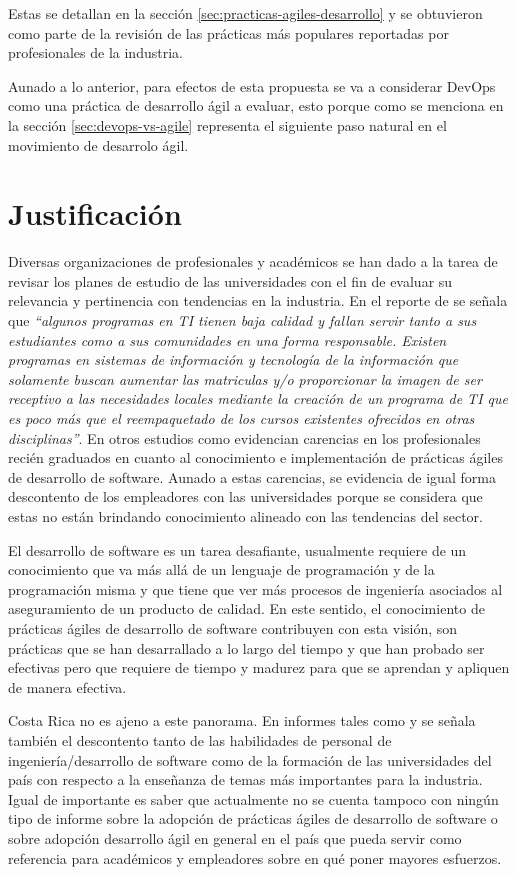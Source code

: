 Estas se detallan en la sección \ref{sec:practicas-agiles-desarrollo} y se obtuvieron como parte de la revisión de las prácticas más populares reportadas por profesionales de la industria.  

Aunado a lo anterior, para efectos de esta propuesta se va a considerar DevOps como una práctica de desarrollo ágil a evaluar, esto porque como se menciona en la sección \ref{sec:devops-vs-agile} representa el siguiente paso natural en el movimiento de desarrolo ágil.

\section{Justificación}
Diversas organizaciones de profesionales y académicos se han dado a la tarea de revisar los planes de estudio de las universidades con el fin de evaluar su relevancia y pertinencia con tendencias en la industria. En el reporte de \cite{shackelford-et-al} se señala que \emph{``algunos programas en TI tienen baja calidad y fallan servir tanto a sus estudiantes como a sus comunidades en una forma responsable. Existen programas en sistemas de información y tecnología de la información que solamente buscan aumentar las matriculas y/o proporcionar la imagen de ser receptivo a las necesidades locales mediante la creación de un programa de TI que es poco más que el reempaquetado de los cursos existentes ofrecidos en otras disciplinas''}. En otros estudios como \cite{advance-it, kropp-meier-1, radermacher-walia} evidencian carencias en los profesionales recién graduados en cuanto al conocimiento e implementación de prácticas ágiles de desarrollo de software. Aunado a estas carencias, se evidencia de igual forma descontento de los empleadores con las universidades porque se considera que estas no están brindando conocimiento alineado con las tendencias del sector.

El desarrollo de software es un tarea desafiante, usualmente requiere de un conocimiento que va más allá de un lenguaje de programación y de la programación misma y que tiene que ver más procesos de ingeniería asociados al aseguramiento de un producto de calidad. En este sentido, el conocimiento de prácticas ágiles de desarrollo de software contribuyen con esta visión, son prácticas que se han desarrallado a lo largo del tiempo y que han probado ser efectivas pero que requiere de tiempo y madurez para que se aprendan y apliquen de manera efectiva. 

Costa Rica no es ajeno a este panorama. En informes tales como \cite{prosic} y \cite{murillo-trejos} se señala también el descontento tanto de las habilidades de personal de ingeniería/desarrollo de software como de la formación de las universidades del país con respecto a la enseñanza de temas más importantes para la industria. Igual de importante es saber que actualmente no se cuenta tampoco con ningún tipo de informe sobre la adopción de prácticas ágiles de desarrollo de software o sobre adopción desarrollo ágil en general en el país que pueda servir como referencia para académicos y empleadores sobre en qué poner mayores esfuerzos.

